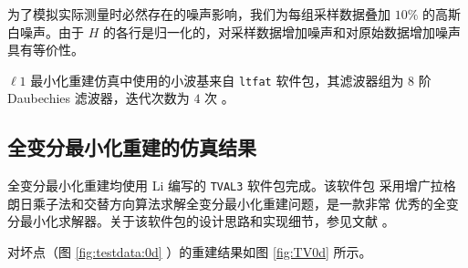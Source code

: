 为了模拟实际测量时必然存在的噪声影响，我们为每组采样数据叠加 $10\%$ 的高斯
白噪声。由于 $H$ 的各行是归一化的，对采样数据增加噪声和对原始数据增加噪声
具有等价性。

$\ell1$ 最小化重建仿真中使用的小波基来自 \verb|ltfat| 软件包，其滤波器组为
$8$ 阶 Daubechies 滤波器，迭代次数为 $4$ 次
\cite{ltfatnote015, ltfatnote030} 。

\subsection{全变分最小化重建的仿真结果}

全变分最小化重建均使用 Li 编写的 \verb|TVAL3| 软件包完成。该软件包
采用增广拉格朗日乘子法和交替方向算法求解全变分最小化重建问题，是一款非常
优秀的全变分最小化求解器。关于该软件包的设计思路和实现细节，参见文献
\cite{TVAL3CBLMaster, TVAL3CBLPhD}。

对坏点（图 \ref{fig:testdata:0d} ）的重建结果如图 \ref{fig:TV0d} 所示。

